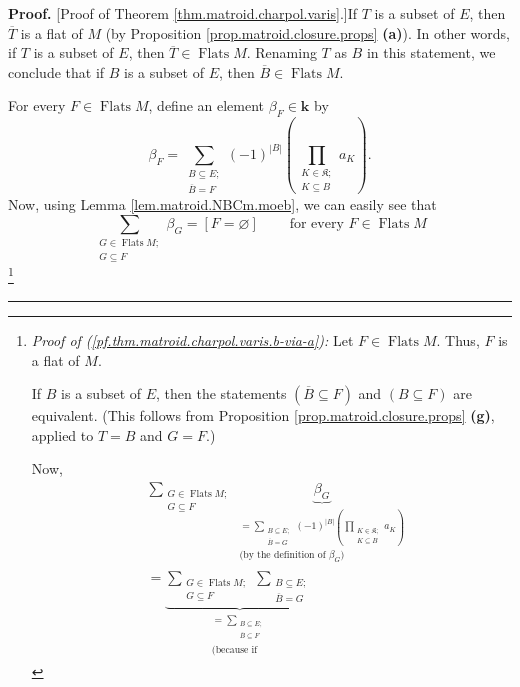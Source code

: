 \documentclass[numbers=enddot,12pt,final,onecolumn,notitlepage]{scrartcl}%
\theoremstyle{definition}
\newenvironment{proof}[1][Proof]{\noindent\textbf{#1.} }{\ \rule{0.5em}{0.5em}}
\let\sumnonlimits\sum
\let\prodnonlimits\prod
\renewcommand{\sum}{\sumnonlimits\limits}
\renewcommand{\prod}{\prodnonlimits\limits}
\begin{document}
\begin{proof}
[Proof of Theorem \ref{thm.matroid.charpol.varis}.]If $T$ is a subset of $E$,
then $\overline{T}$ is a flat of $M$ (by Proposition
\ref{prop.matroid.closure.props} \textbf{(a)}). In other words, if $T$ is a
subset of $E$, then $\overline{T}\in\operatorname*{Flats}M$. Renaming $T$ as
$B$ in this statement, we conclude that if $B$ is a subset of $E$, then
$\overline{B}\in\operatorname*{Flats}M$.

For every $F\in\operatorname*{Flats}M$, define an element $\beta_{F}%
\in\mathbf{k}$ by%
\[
\beta_{F}=\sum_{\substack{B\subseteq E;\\\overline{B}=F}}\left(  -1\right)
^{\left\vert B\right\vert }\left(  \prod_{\substack{K\in\mathfrak{K}%
;\\K\subseteq B}}a_{K}\right)  .
\]
Now, using Lemma \ref{lem.matroid.NBCm.moeb}, we can easily see that%
\begin{equation}
\sum_{\substack{G\in\operatorname*{Flats}M;\\G\subseteq F}}\beta_{G}=\left[
F=\varnothing\right]  \ \ \ \ \ \ \ \ \ \ \text{for every }F\in
\operatorname*{Flats}M \label{pf.thm.matroid.charpol.varis.b-via-a}%
\end{equation}
\footnote{\textit{Proof of (\ref{pf.thm.matroid.charpol.varis.b-via-a}):} Let
$F\in\operatorname*{Flats}M$. Thus, $F$ is a flat of $M$.
\par
If $B$ is a subset of $E$, then the statements $\left(  \overline{B}\subseteq
F\right)  $ and $\left(  B\subseteq F\right)  $ are equivalent. (This follows
from Proposition \ref{prop.matroid.closure.props} \textbf{(g)}, applied to
$T=B$ and $G=F$.)
\par
Now,%
\begin{align*}
&  \sum_{\substack{G\in\operatorname*{Flats}M;\\G\subseteq F}%
}\underbrace{\beta_{G}}_{\substack{=\sum_{\substack{B\subseteq E;\\\overline
{B}=G}}\left(  -1\right)  ^{\left\vert B\right\vert }\left(  \prod
_{\substack{K\in\mathfrak{K};\\K\subseteq B}}a_{K}\right)  \\\text{(by the
definition of }\beta_{G}\text{)}}}\\
&  =\underbrace{\sum_{\substack{G\in\operatorname*{Flats}M;\\G\subseteq
F}}\sum_{\substack{B\subseteq E;\\\overline{B}=G}}}_{\substack{=\sum
_{\substack{B\subseteq E;\\\overline{B}\subseteq F}}\\\text{(because if
}}}
\end{align*}}
\end{proof}
\end{document}

